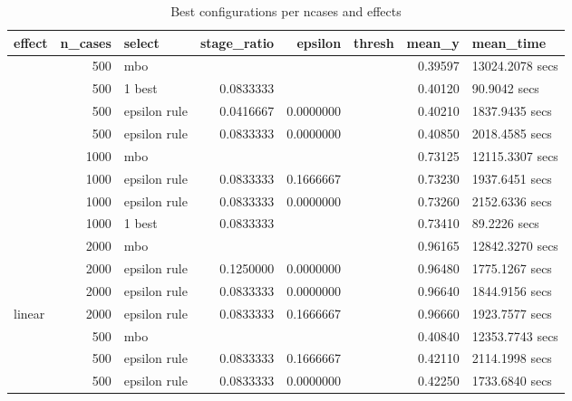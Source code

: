 
\begin{longtable}[t]{lrlrrrrl}
\caption{\label{tab:table_best}Best configurations per ncases and effects}\\
\toprule
effect & n\_cases & select & stage\_ratio & epsilon & thresh & mean\_y & mean\_time\\
\midrule
 & 500 & mbo &  &  &  & 0.39597 & 13024.2078 secs\\

 & 500 & 1 best & 0.0833333 &  &  & 0.40120 & 90.9042 secs\\

 & 500 & epsilon rule & 0.0416667 & 0.0000000 &  & 0.40210 & 1837.9435 secs\\

 & 500 & epsilon rule & 0.0833333 & 0.0000000 &  & 0.40850 & 2018.4585 secs\\

 & 1000 & mbo &  &  &  & 0.73125 & 12115.3307 secs\\

 & 1000 & epsilon rule & 0.0833333 & 0.1666667 &  & 0.73230 & 1937.6451 secs\\

 & 1000 & epsilon rule & 0.0833333 & 0.0000000 &  & 0.73260 & 2152.6336 secs\\

 & 1000 & 1 best & 0.0833333 &  &  & 0.73410 & 89.2226 secs\\

 & 2000 & mbo &  &  &  & 0.96165 & 12842.3270 secs\\

 & 2000 & epsilon rule & 0.1250000 & 0.0000000 &  & 0.96480 & 1775.1267 secs\\

 & 2000 & epsilon rule & 0.0833333 & 0.0000000 &  & 0.96640 & 1844.9156 secs\\

\multirow{-12}{*}{\raggedright\arraybackslash linear} & 2000 & epsilon rule & 0.0833333 & 0.1666667 &  & 0.96660 & 1923.7577 secs\\
\cmidrule{1-8}
 & 500 & mbo &  &  &  & 0.40840 & 12353.7743 secs\\

 & 500 & epsilon rule & 0.0833333 & 0.1666667 &  & 0.42110 & 2114.1998 secs\\

 & 500 & epsilon rule & 0.0833333 & 0.0000000 &  & 0.42250 & 1733.6840 secs\\


\end{longtable}
